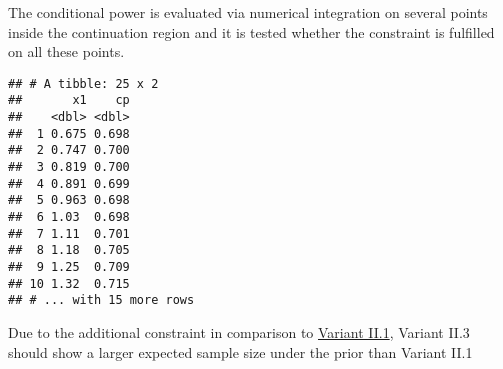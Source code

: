 \documentclass[
]{book}
\newenvironment{Shaded}{\begin{snugshade}}{\end{snugshade}}
\newcommand{\DataTypeTok}[1]{\textcolor[rgb]{0.13,0.29,0.53}{#1}}
\newcommand{\DecValTok}[1]{\textcolor[rgb]{0.00,0.00,0.81}{#1}}
\newcommand{\FloatTok}[1]{\textcolor[rgb]{0.00,0.00,0.81}{#1}}
\newcommand{\KeywordTok}[1]{\textcolor[rgb]{0.13,0.29,0.53}{\textbf{#1}}}
\newcommand{\NormalTok}[1]{#1}
\newcommand{\OperatorTok}[1]{\textcolor[rgb]{0.81,0.36,0.00}{\textbf{#1}}}
\newcommand{\StringTok}[1]{\textcolor[rgb]{0.31,0.60,0.02}{#1}}
\begin{document}
The conditional power is evaluated via numerical integration on several points
inside the continuation region and it is tested whether the constraint is
fulfilled on all these points.

\begin{Shaded}
\end{Shaded}

\begin{verbatim}
## # A tibble: 25 x 2
##       x1    cp
##    <dbl> <dbl>
##  1 0.675 0.698
##  2 0.747 0.700
##  3 0.819 0.700
##  4 0.891 0.699
##  5 0.963 0.698
##  6 1.03  0.698
##  7 1.11  0.701
##  8 1.18  0.705
##  9 1.25  0.709
## 10 1.32  0.715
## # ... with 15 more rows
\end{verbatim}

Due to the additional constraint in comparison to \protect\hyperlink{variantII_1}{Variant II.1},
Variant II.3 should show a larger expected sample size under the prior than
Variant II.1

\begin{Shaded}
\end{Shaded}
\end{document}
